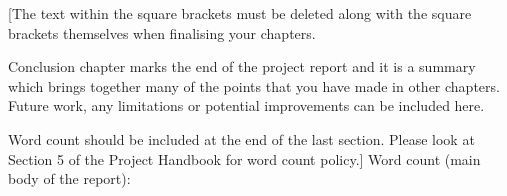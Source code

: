 [The text within the square brackets must be deleted along with the square brackets themselves when finalising your chapters. 


Conclusion chapter marks the end of the project report and it is a summary which brings together many of the points that you have made in other chapters. Future work, any limitations or potential improvements can be included here.



\vspace*{\fill}
Word count should be included at the end of the last section. Please look at Section 5 of the Project Handbook for word count policy.]
\newline
Word count (main body of the report): 